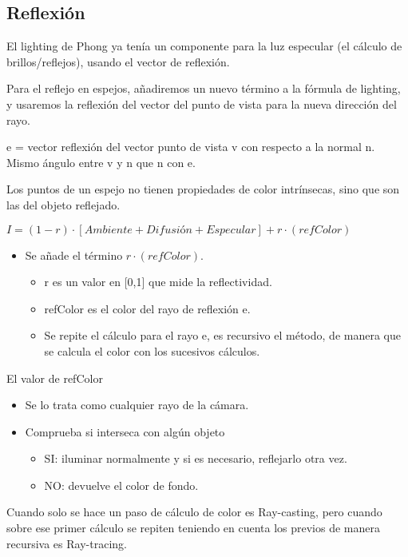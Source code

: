 \subsection{Reflexión}
El lighting de Phong ya tenía un componente para la luz especular (el cálculo de brillos/reflejos), usando el vector de reflexión.

Para el reflejo en espejos, añadiremos un nuevo término a la fórmula de lighting, y usaremos la reflexión del vector del punto de vista para la nueva dirección del rayo.

e = vector reflexión del vector punto de vista v con respecto a la normal n. Mismo ángulo entre v y n que n con e.

Los puntos de un espejo no tienen propiedades de color intrínsecas, sino que son las del objeto reflejado.

$I=(1-r)\cdot[\textit{Ambiente}+\textit{Difusión}+\textit{Especular}]+r\cdot(refColor)$
\pagebreak

\begin{itemize}
    \item Se añade el término $r\cdot(refColor)$.
    \begin{itemize}
        \item r es un valor en [0,1] que mide la reflectividad.
        \item refColor es el color del rayo de reflexión e.
        \item Se repite el cálculo para el rayo e, es recursivo el método, de manera que se calcula el color con los sucesivos cálculos.
    \end{itemize}
\end{itemize}

El valor de refColor
\begin{itemize}
    \item Se lo trata como cualquier rayo de la cámara.
    \item Comprueba si interseca con algún objeto
    \begin{itemize}
        \item SI: iluminar normalmente y si es necesario, reflejarlo otra vez.
        \item NO: devuelve el color de fondo.
    \end{itemize}
\end{itemize}

Cuando solo se hace un paso de cálculo de color es Ray-casting, pero cuando sobre ese primer cálculo se repiten teniendo en cuenta los previos de manera recursiva es Ray-tracing.

